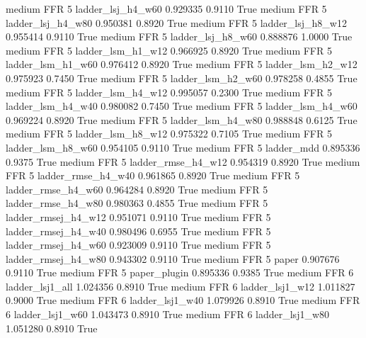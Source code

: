     medium      FFR                 5   ladder_lsj_h4_w60   0.929335      0.9110    True
    medium      FFR                 5   ladder_lsj_h4_w80   0.950381      0.8920    True
    medium      FFR                 5   ladder_lsj_h8_w12   0.955414      0.9110    True
    medium      FFR                 5   ladder_lsj_h8_w60   0.888876      1.0000    True
    medium      FFR                 5   ladder_lsm_h1_w12   0.966925      0.8920    True
    medium      FFR                 5   ladder_lsm_h1_w60   0.976412      0.8920    True
    medium      FFR                 5   ladder_lsm_h2_w12   0.975923      0.7450    True
    medium      FFR                 5   ladder_lsm_h2_w60   0.978258      0.4855    True
    medium      FFR                 5   ladder_lsm_h4_w12   0.995057      0.2300    True
    medium      FFR                 5   ladder_lsm_h4_w40   0.980082      0.7450    True
    medium      FFR                 5   ladder_lsm_h4_w60   0.969224      0.8920    True
    medium      FFR                 5   ladder_lsm_h4_w80   0.988848      0.6125    True
    medium      FFR                 5   ladder_lsm_h8_w12   0.975322      0.7105    True
    medium      FFR                 5   ladder_lsm_h8_w60   0.954105      0.9110    True
    medium      FFR                 5          ladder_mdd   0.895336      0.9375    True
    medium      FFR                 5  ladder_rmse_h4_w12   0.954319      0.8920    True
    medium      FFR                 5  ladder_rmse_h4_w40   0.961865      0.8920    True
    medium      FFR                 5  ladder_rmse_h4_w60   0.964284      0.8920    True
    medium      FFR                 5  ladder_rmse_h4_w80   0.980363      0.4855    True
    medium      FFR                 5 ladder_rmsej_h4_w12   0.951071      0.9110    True
    medium      FFR                 5 ladder_rmsej_h4_w40   0.980496      0.6955    True
    medium      FFR                 5 ladder_rmsej_h4_w60   0.923009      0.9110    True
    medium      FFR                 5 ladder_rmsej_h4_w80   0.943302      0.9110    True
    medium      FFR                 5               paper   0.907676      0.9110    True
    medium      FFR                 5        paper_plugin   0.895336      0.9385    True
    medium      FFR                 6     ladder_lsj1_all   1.024356      0.8910    True
    medium      FFR                 6     ladder_lsj1_w12   1.011827      0.9000    True
    medium      FFR                 6     ladder_lsj1_w40   1.079926      0.8910    True
    medium      FFR                 6     ladder_lsj1_w60   1.043473      0.8910    True
    medium      FFR                 6     ladder_lsj1_w80   1.051280      0.8910    True
